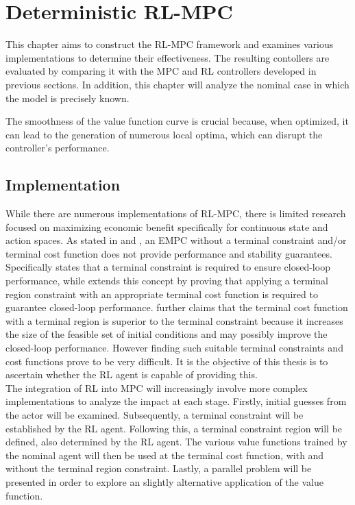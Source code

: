 \chapter{Deterministic RL-MPC}
\label{chapter:deterministic_RL_MPC}

This chapter aims to construct the RL-MPC framework and examines various implementations to determine their effectiveness. The resulting contollers are evaluated by comparing it with the MPC and RL controllers developed in previous sections. In addition, this chapter will analyze the nominal case in which the model is precisely known. 


The smoothness of the value function curve is crucial because, when optimized, it can lead to the generation of numerous local optima, which can disrupt the controller's performance.


\section{Implementation}
While there are numerous implementations of RL-MPC, there is limited research focused on maximizing economic benefit specifically for continuous state and action spaces. As stated in \cite{ellisTutorialReviewEconomic2014} and \cite{amritEconomicOptimizationUsing2011}, an EMPC without a terminal constraint and/or terminal cost function does not provide performance and stability guarantees. Specifically \cite{ellisTutorialReviewEconomic2014} states that a terminal constraint is required to ensure closed-loop performance, while \cite{amritEconomicOptimizationUsing2011} extends this concept by proving that applying a terminal region constraint with an appropriate terminal cost function is required to guarantee closed-loop performance. \cite{amritEconomicOptimizationUsing2011} further claims that the terminal cost function with a terminal region is superior to the terminal constraint because it increases the size of the feasible set of initial conditions and may possibly improve the closed-loop performance. However finding such suitable terminal constraints and cost functions prove to be very difficult. It is the objective of this thesis is to ascertain whether the RL agent is capable of providing this.\\

The integration of RL into MPC will increasingly involve more complex implementations to analyze the impact at each stage. Firstly, initial guesses from the actor will be examined. Subsequently, a terminal constraint will be established by the RL agent. Following this, a terminal constraint region will be defined, also determined by the RL agent. The various value functions trained by the nominal agent will then be used at the terminal cost function, with and without the terminal region constraint. Lastly, a parallel problem will be presented in order to explore an slightly alternative application of the value function.

